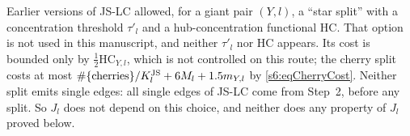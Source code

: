\begin{remark}\label{s6:remStar}
Earlier versions of JS-LC allowed, for a giant pair $(Y,l)$, a ``star split'' with a concentration threshold $\tau'_l$ and a hub-concentration functional $\mathrm{HC}$. That option is not used in this manuscript, and neither $\tau'_l$ nor $\mathrm{HC}$ appears. Its cost is bounded only by $\frac12\mathrm{HC}_{Y,l}$, which is not controlled on this route; the cherry split costs at most $\#\{\text{cherries}\}/K^{\mathrm{JS}}_l+6M_l+1.5m_{Y,l}$ by \eqref{s6:eqCherryCost}. Neither split emits single edges: all single edges of JS-LC come from Step~2, before any split. So $J_l$ does not depend on this choice, and neither does any property of $J_l$ proved below.
\deps{\ref{s6:lemJSLC}}
\end{remark}

